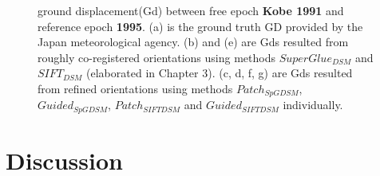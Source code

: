 \begin{figure}[htbp]
\begin{center}
		\caption{{\scriptsize ground displacement(Gd) between free epoch \textbf{Kobe 1991} and reference epoch \textbf{1995}. (a) is the ground truth GD provided by the Japan meteorological agency. (b) and (e) are Gds resulted from roughly co-registered orientations using methods $SuperGlue_{DSM}$ and $SIFT_{DSM}$ (elaborated in Chapter 3). (c, d, f, g) are Gds resulted from refined orientations using methods $Patch_{SpGDSM}$, $Guided_{SpGDSM}$, $Patch_{SIFTDSM}$ and $Guided_{SIFTDSM}$ individually.}}
		\label{GdKobe}
	\end{center}
\end{figure} 

\section{Discussion}
